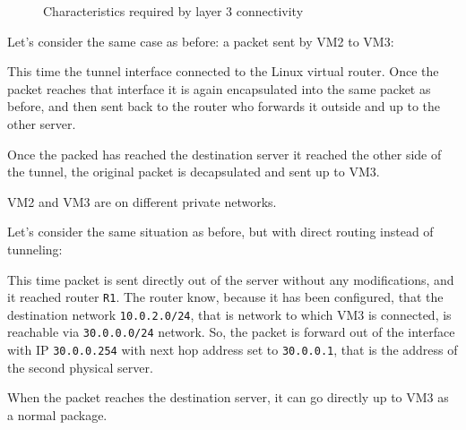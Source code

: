 \begin{figure}[h!]
    \centering
    \caption{Characteristics required by layer 3 connectivity}
\end{figure}

\begin{eg}
    Let's consider the same case as before: a packet sent by VM2 to VM3:

    \begin{figure}[h!]
        \centering
    \end{figure}

    \noindent
    This time the tunnel interface connected to the Linux virtual router. Once
    the packet reaches that interface it is again encapsulated into the same
    packet as before, and then sent back to the router who forwards it outside
    and up to the other server.

    \newpage
    \begin{figure}[ht!]
        \centering
    \end{figure}

    \noindent
    Once the packed has reached the destination server it reached the other
    side of the tunnel, the original packet is decapsulated and sent up to VM3.
\end{eg}
\begin{note}
    VM2 and VM3 are on different private networks.
\end{note}

\begin{eg}
    Let's consider the same situation as before, but with direct routing instead
    of tunneling:

    \begin{figure}[h!]
        \centering
    \end{figure}

    \noindent
    This time packet is sent directly out of the server without any
    modifications, and it reached router \texttt{R1}. The router know, because
    it has been configured, that the destination network \texttt{10.0.2.0/24},
    that is network to which VM3 is connected, is reachable via \texttt{30.0.0.0/24}
    network. So, the packet is forward out of the interface with IP
    \texttt{30.0.0.254} with next hop address set to \texttt{30.0.0.1}, that is
    the address of the second physical server.

    \bigskip\noindent
    When the packet reaches the destination server, it can go directly up to
    VM3 as a normal package.

    \newpage
    \begin{figure}[ht!]
        \centering
    \end{figure}
\end{eg}

